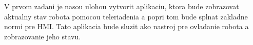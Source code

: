 V prvom zadani je nasou ulohou vytvorit aplikaciu, ktora bude zobrazovat aktualny stav robota pomocou teleriadenia a
popri tom bude splnat zakladne normi pre HMI. Tato aplikacia bude sluzit ako nastroj pre ovladanie robota a zobrazovanie
jeho stavu.

